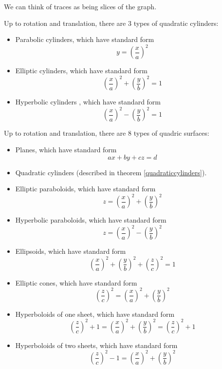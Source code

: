 We can think of traces as being slices of the graph. 


\begin{theorem}\label{quadraticcylinders}
Up to rotation and translation, there are 3 types of quadratic cylinders:

\begin{itemize}
    \item Parabolic cylinders, which have standard form $$y = \left(\frac{x}{a}\right)^2$$
    \item Elliptic cylinders, which have standard form $$\left(\frac{x}{a}\right)^2 + \left(\frac{y}{b}\right)^2 = 1$$
    \item Hyperbolic cylinders , which have standard form $$\left(\frac{x}{a}\right)^2 - \left(\frac{y}{b}\right)^2 = 1$$
\end{itemize}

\end{theorem}







\begin{theorem}
Up to rotation and translation, there are 8 types of quadric surfaces:

\begin{itemize}
    \item Planes, which have standard form $$ax + by + cz = d$$
    \item Quadratic cylinders (described in theorem \ref{quadraticcylinders}).
    \item Elliptic paraboloids, which have standard form $$z = \left(\frac{x}{a}\right)^2 + \left(\frac{y}{b}\right)^2$$
    \item Hyperbolic paraboloids, which have standard form $$z = \left(\frac{x}{a}\right)^2 - \left(\frac{y}{b}\right)^2$$
    \item Ellipsoids, which have standard form $$\left(\frac{x}{a}\right)^2 + \left(\frac{y}{b}\right)^2  + \left(\frac{z}{c}\right)^2 = 1$$
    \item Elliptic cones, which have standard form $$\left(\frac{z}{c}\right)^2  = \left(\frac{x}{a}\right)^2 + \left(\frac{y}{b}\right)^2$$
    \item Hyperboloids of one sheet, which have standard form $$\left(\frac{z}{c}\right)^2 +1 = \left(\frac{x}{a}\right)^2 + \left(\frac{y}{b}\right)^2  = \left(\frac{z}{c}\right)^2 + 1 $$
    \item Hyperboloids of two sheets, which have standard form $$\left(\frac{z}{c}\right)^2 - 1 = \left(\frac{x}{a}\right)^2 + \left(\frac{y}{b}\right)^2$$
\end{itemize}
\end{theorem}


